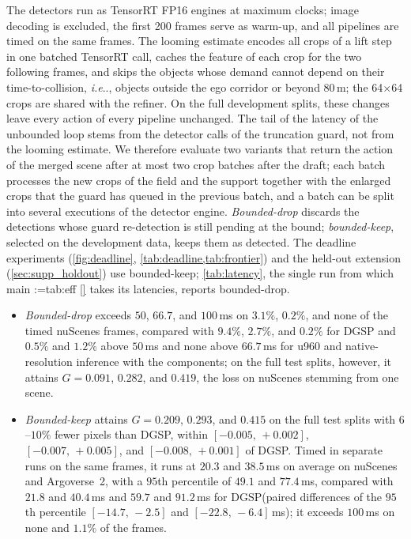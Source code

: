 \documentclass[10pt,letterpaper]{article}
\makeatletter
\DeclareRobustCommand\onedot{\futurelet\@let@token\@onedot}
\def\@onedot{\ifx\@let@token.\else.\null\fi\xspace}
\def\ie{\emph{i.e}\onedot} \def\Ie{\emph{I.e}\onedot}
\newcommand{\method}{DGSP\xspace}
\newcommand{\G}{G}
\newcommand{\ci}[2]{[#1,\allowbreak\,#2]}
\theoremstyle{remark}
\theoremstyle{plain}
\theoremstyle{definition}
\DeclareRobustCommand{\mref}[1]{\def\mref@list{}\@for\mref@i:=#1\do{\ifx\mref@list\@empty\edef\mref@list{M-\mref@i}\else\edef\mref@list{\mref@list,M-\mref@i}\fi}%
  \edef\mref@cmd{\noexpand\cref*{\mref@list}}\mref@cmd}
\makeatother
\begin{document}
The detectors run as TensorRT FP16 engines at maximum clocks; image decoding is excluded, the first 200 frames serve as warm-up, and all pipelines are timed on the same frames.
The looming estimate encodes all crops of a lift step in one batched TensorRT call, caches the feature of each crop for the two following frames, and skips the objects whose demand cannot depend on their time-to-collision, \ie, objects outside the ego corridor or beyond $80$\,m; the 64$\times$64 crops are shared with the refiner.
On the full development splits, these changes leave every action of every pipeline unchanged.
The tail of the latency of the unbounded loop stems from the detector calls of the truncation guard, not from the looming estimate.
We therefore evaluate two variants that return the action of the merged scene after at most two crop batches after the draft; each batch processes the new crops of the field and the support together with the enlarged crops that the guard has queued in the previous batch, and a batch can be split into several executions of the detector engine.
\emph{Bounded-drop} discards the detections whose guard re-detection is still pending at the bound; \emph{bounded-keep}, selected on the development data, keeps them as detected.
The deadline experiments (\cref{fig:deadline}, \cref{tab:deadline,tab:frontier}) and the held-out extension (\cref{sec:supp_holdout}) use bounded-keep; \cref{tab:latency}, the single run from which main \mref{tab:eff} takes its latencies, reports bounded-drop.
\begin{itemize}[leftmargin=12pt, itemsep=1pt, topsep=2pt]
\item \emph{Bounded-drop} exceeds $50$, $66.7$, and $100$\,ms on $3.1\%$, $0.2\%$, and none of the timed nuScenes frames, compared with $9.4\%$, $2.7\%$, and $0.2\%$ for \method and $0.5\%$ and $1.2\%$ above $50$\,ms and none above $66.7$\,ms for u960 and native-resolution inference with the components; on the full test splits, however, it attains $\G=0.091$, $0.282$, and $0.419$, the loss on nuScenes stemming from one scene.
\item \emph{Bounded-keep} attains $\G=0.209$, $0.293$, and $0.415$ on the full test splits with $6$--$10\%$ fewer pixels than \method, within $\ci{-0.005}{+0.002}$, $\ci{-0.007}{+0.005}$, and $\ci{-0.008}{+0.001}$ of \method. Timed in separate runs on the same frames, it runs at $20.3$ and $38.5$\,ms on average on nuScenes and Argoverse~2, with a $95$th percentile of $49.1$ and $77.4$\,ms, compared with $21.8$ and $40.4$\,ms and $59.7$ and $91.2$\,ms for \method (paired differences of the $95$th percentile $\ci{-14.7}{-2.5}$ and $\ci{-22.8}{-6.4}$\,ms); it exceeds $100$\,ms on none and $1.1\%$ of the frames.
\end{itemize}
\end{document}
